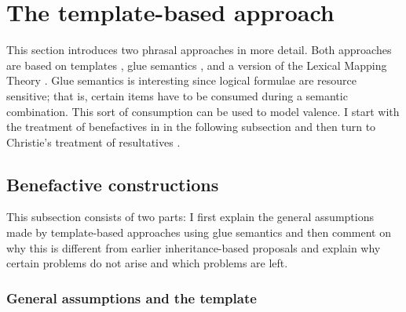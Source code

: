 \chapter{The template-based approach}
\label{sec-template-approach}

This section introduces two phrasal approaches in more detail. Both approaches are based
on templates \citep{DKK2004a}, glue semantics \citep{Dalrymple99a-ed}, and a version of the Lexical
Mapping Theory \citep{BresnanK89a-u,Kibort2008a}. Glue semantics is interesting since logical
formulae are resource sensitive;
that is, certain items have to
be consumed during a semantic combination. This sort of consumption can be used to model valence. I
start with the treatment of benefactives in \citet{AGT2014a} in the following subsection and then
turn to Christie's treatment of resultatives \citeyearpar{Christie2010a}.

\section{Benefactive constructions}

This subsection consists of two parts: I first explain the general assumptions made by
template-based approaches using glue semantics and then comment on why this is different from
earlier inheritance-based proposals and explain why certain problems do not arise and which problems are left.

\subsection{General assumptions and the  template}

